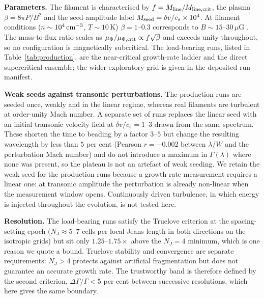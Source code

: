 \documentclass[usenatbib,twoside,twocolumn]{mnras}
\begin{document}
\smallskip\noindent\textbf{Parameters.} The filament is characterised by $f=M_{\rm line}/M_{\rm line,crit}$, the plasma $\beta=8\pi P/B^2$ and the seed-amplitude label $M_{\rm seed}=\delta v/c_s\times10^{4}$. At filament conditions ($n\sim10^4\,{\rm cm^{-3}}$, $T\sim10$\,K) $\beta=1$--$0.3$ corresponds to $B\sim15$--$30\,\mu$G \citep{Crutcher2012}. The mass-to-flux ratio scales as $\mu_\Phi/\mu_{\Phi,\rm crit}\propto f\sqrt{\beta}$ and exceeds unity throughout, so no configuration is magnetically subcritical. The load-bearing runs, listed in Table~\ref{tab:production}, are the near-critical growth-rate ladder and the direct supercritical ensemble; the wider exploratory grid is given in the deposited run manifest.

\smallskip\noindent\textbf{Weak seeds against transonic perturbations.} The production runs are seeded once, weakly and in the linear regime, whereas real filaments are turbulent at order-unity Mach number. A separate set of runs replaces the linear seed with an initial transonic velocity field at $\delta v/c_s=1$--$3$ drawn from the same spectrum. These shorten the time to beading by a factor $3$--$5$ but change the resulting wavelength by less than $5$ per cent (Pearson $r=-0.002$ between $\lambda/W$ and the perturbation Mach number) and do not introduce a maximum in $\Gamma(\lambda)$ where none was present, so the plateau is not an artefact of weak seeding. We retain the weak seed for the production runs because a growth-rate measurement requires a linear one: at transonic amplitude the perturbation is already non-linear when the measurement window opens. Continuously driven turbulence, in which energy is injected throughout the evolution, is not tested here.

\smallskip\noindent\textbf{Resolution.} The load-bearing runs satisfy the Truelove criterion at the spacing-setting epoch ($N_J\approx5$--$7$ cells per local Jeans length in both directions on the isotropic grids) but sit only $1.25$--$1.75\times$ above the $N_J=4$ minimum, which is one reason we quote a bound. Truelove stability and convergence are separate requirements: $N_J>4$ protects against artificial fragmentation but does not guarantee an accurate growth rate. The trustworthy band is therefore defined by the second criterion, $\Delta\Gamma/\Gamma<5$ per cent between successive resolutions, which here gives the same boundary.
\end{document}
